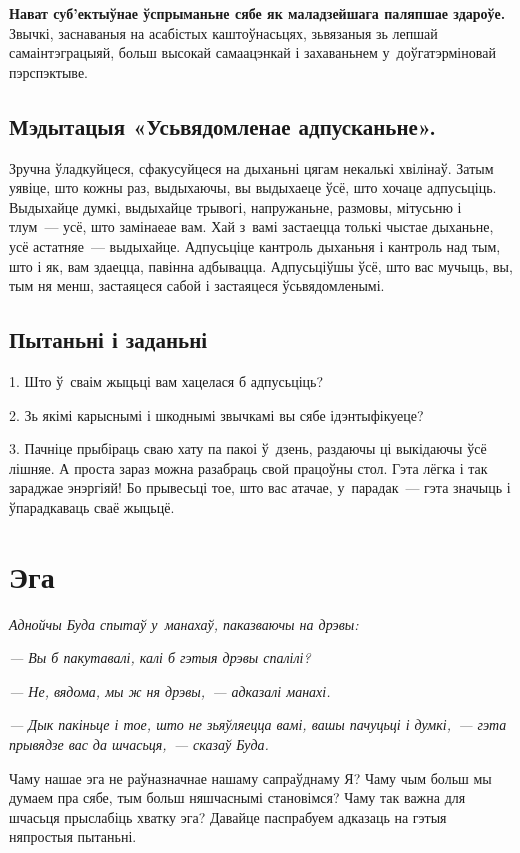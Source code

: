 \textbf{Нават суб'ектыўнае ўспрыманьне сябе як маладзейшага паляпшае здароўе.} Звычкі, заснаваныя на асабістых каштоўнасьцях, зьвязаныя зь лепшай самаінтэграцыяй, больш высокай самаацэнкай і захаваньнем у~доўгатэрміновай пэрспэктыве.

\subsection*{Мэдытацыя «Усьвядомленае адпусканьне».}

Зручна ўладкуйцеся, сфакусуйцеся на дыханьні цягам некалькі хвілінаў. Затым уявіце, што кожны раз, выдыхаючы, вы выдыхаеце ўсё, што хочаце адпусьціць. Выдыхайце думкі, выдыхайце трывогі, напружаньне, размовы, мітусьню і тлум~--- усё, што замінаеае вам. Хай з~вамі застаецца толькі чыстае дыханьне, усё астатняе~--- выдыхайце. Адпусьціце кантроль дыханьня і кантроль над тым, што і як, вам здаецца, павінна адбывацца. Адпусьціўшы ўсё, што вас мучыць, вы, тым ня менш, застаяцеся сабой і застаяцеся ўсьвядомленымі.

\subsection*{Пытаньні і заданьні}

1. Што ў~сваім жыцьці вам хацелася б адпусьціць?

2. Зь якімі карыснымі і шкоднымі звычкамі вы сябе ідэнтыфікуеце?

3. Пачніце прыбіраць сваю хату па пакоі ў~дзень, раздаючы ці выкідаючы ўсё лішняе. А проста зараз можна разабраць свой працоўны стол. Гэта лёгка і так зараджае энэргіяй! Бо прывесьці тое, што вас атачае, у~парадак~--- гэта значыць і ўпарадкаваць сваё жыцьцё.


\section{Эга}

\emph{Аднойчы Буда спытаў у~манахаў, паказваючы на дрэвы:} 

\emph{--- Вы б пакутавалі, калі б гэтыя дрэвы спалілі?}

\emph{--- Не, вядома, мы ж ня дрэвы,~--- адказалі манахі.}

\emph{--- Дык пакіньце і тое, што не зьяўляецца вамі, вашы пачуцьці і думкі,~--- гэта прывядзе вас да шчасьця,~--- сказаў Буда.}

Чаму нашае эга не раўназначнае нашаму сапраўднаму Я? Чаму чым больш мы думаем пра сябе, тым больш няшчаснымі становімся? Чаму так важна для шчасьця прыслабіць хватку эга? Давайце паспрабуем адказаць на гэтыя няпростыя пытаньні.

